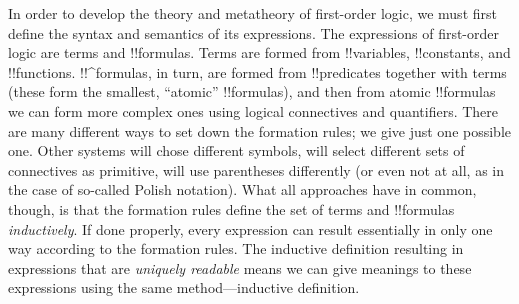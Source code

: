 \documentclass[../../../include/open-logic-section]{subfiles}
\begin{document}


In order to develop the theory and metatheory of first-order logic, we
must first define the syntax and semantics of its expressions.  The
expressions of first-order logic are terms and !!{formula}s.  Terms
are formed from !!{variable}s, !!{constant}s, and !!{function}s.
!!^{formula}s, in turn, are formed from !!{predicate}s together with
terms (these form the smallest, ``atomic'' !!{formula}s), and then
from atomic !!{formula}s we can form more complex ones using logical
connectives and quantifiers.  There are many different ways to set
down the formation rules; we give just one possible one. Other systems
will chose different symbols, will select different sets of
connectives as primitive, will use parentheses differently (or even not
at all, as in the case of so-called Polish notation).  What all
approaches have in common, though, is that the formation rules define
the set of terms and !!{formula}s \emph{inductively}. If done
properly, every expression can result essentially in only one way
according to the formation rules.  The inductive definition resulting
in expressions that are \emph{uniquely readable} means we can give
meanings to these expressions using the same method---inductive
definition.
\end{document}
